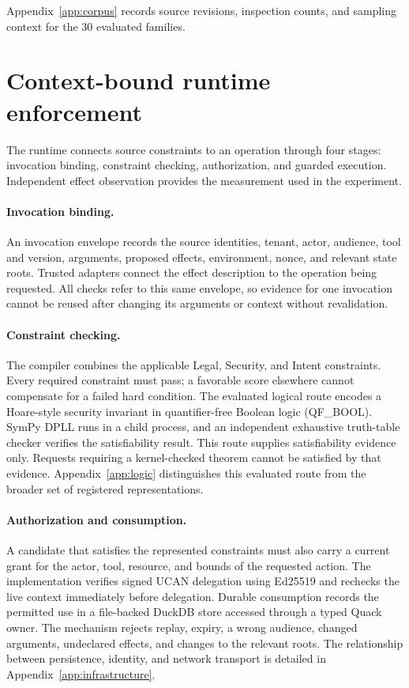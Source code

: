 \documentclass{article}
\begin{document}
Appendix~\ref{app:corpus} records source revisions, inspection counts, and sampling context for the 30 evaluated families.

\section{Context-bound runtime enforcement}
\label{sec:method}

The runtime connects source constraints to an operation through four stages: invocation binding, constraint checking, authorization, and guarded execution. Independent effect observation provides the measurement used in the experiment.

\paragraph{Invocation binding.}
An invocation envelope records the source identities, tenant, actor, audience, tool and version, arguments, proposed effects, environment, nonce, and relevant state roots. Trusted adapters connect the effect description to the operation being requested. All checks refer to this same envelope, so evidence for one invocation cannot be reused after changing its arguments or context without revalidation.

\paragraph{Constraint checking.}
The compiler combines the applicable Legal, Security, and Intent constraints. Every required constraint must pass; a favorable score elsewhere cannot compensate for a failed hard condition. The evaluated logical route encodes a Hoare-style security invariant in quantifier-free Boolean logic (QF\_BOOL). SymPy DPLL runs in a child process, and an independent exhaustive truth-table checker verifies the satisfiability result. This route supplies satisfiability evidence only. Requests requiring a kernel-checked theorem cannot be satisfied by that evidence. Appendix~\ref{app:logic} distinguishes this evaluated route from the broader set of registered representations.

\paragraph{Authorization and consumption.}
A candidate that satisfies the represented constraints must also carry a current grant for the actor, tool, resource, and bounds of the requested action. The implementation verifies signed UCAN delegation using Ed25519 and rechecks the live context immediately before delegation. Durable consumption records the permitted use in a file-backed DuckDB store accessed through a typed Quack owner. The mechanism rejects replay, expiry, a wrong audience, changed arguments, undeclared effects, and changes to the relevant roots. The relationship between persistence, identity, and network transport is detailed in Appendix~\ref{app:infrastructure}.
\end{document}
